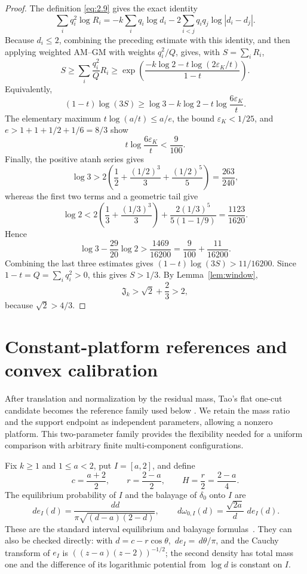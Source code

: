 \documentclass[11pt]{article}
\numberwithin{equation}{section}
\theoremstyle{plain}
\theoremstyle{definition}
\theoremstyle{remark}
\newcommand{\1}{\mathbf 1}
\newcommand{\dd}{\,d}
\newcommand{\eps}{\varepsilon}
\newcommand{\J}{\mathfrak J}
\begin{document}
\begin{proof}
The definition \eqref{eq:2.9} gives the exact identity
\[
 \sum_iq_i^2\log R_i
 =-k\sum_iq_i\log d_i
  -2\sum_{i<j}q_iq_j\log|d_i-d_j|.
\]
Because $d_i\le2$, combining the preceding estimate with this identity, and then applying weighted AM--GM with
weights $q_i^2/Q$, gives, with $S=\sum_iR_i$,
\[
 S\ge\sum_i\frac{q_i^2}{Q}R_i
 \ge\exp\left(\frac{-k\log2-t\log(2\eps_K/t)}{1-t}\right).
\]
Equivalently,
\[
 (1-t)\log(3S)
 \ge\log3-k\log2-t\log\frac{6\eps_K}{t}.
\]
The elementary maximum $t\log(a/t)\le a/e$, the bound $\eps_K<1/25$, and
$e>1+1+1/2+1/6=8/3$ show
\[
 t\log\frac{6\eps_K}{t}<\frac9{100}.
\]
Finally, the positive atanh series gives
\[
 \log3>2\left(\frac12+\frac{(1/2)^3}{3}+\frac{(1/2)^5}{5}\right)
 =\frac{263}{240},
\]
whereas the first two terms and a geometric tail give
\[
 \log2<2\left(\frac13+\frac{(1/3)^3}{3}\right)
 +\frac{2(1/3)^5}{5(1-1/9)}=\frac{1123}{1620}.
\]
Hence
\[
 \log3-\frac{29}{20}\log2
 >\frac{1469}{16200}=\frac9{100}+\frac{11}{16200}.
\]
Combining the last three estimates gives
$(1-t)\log(3S)>11/16200$.  Since $1-t=Q=\sum_iq_i^2>0$, this gives
$S>1/3$.  By
Lemma~\ref{lem:window},
\[
 \J_k>\sqrt2+\frac23>2,
\]
because $\sqrt2>4/3$.
\end{proof}

\section{Constant-platform references and convex calibration}

After translation and normalization by the residual mass, Tao's flat
one-cut candidate becomes the reference family used below
\cite[Section~4]{Tao1038Updated}.  We retain the mass ratio and the support
endpoint as independent parameters, allowing a nonzero platform.  This
two-parameter family provides the flexibility needed for a uniform
comparison with arbitrary finite multi-component configurations.

Fix $k\ge1$ and $1\le a<2$, put $I=[a,2]$, and define
\[
 c=\frac{a+2}{2},\qquad r=\frac{2-a}{2},\qquad H=\frac r2=\frac{2-a}{4}.
\]
The equilibrium probability of $I$ and the balayage of $\delta_0$ onto
$I$ are
\begin{equation}
 \dd e_I(d)=\frac{\dd d}{\pi\sqrt{(d-a)(2-d)}},\qquad
 \dd\omega_{0,I}(d)=\frac{\sqrt{2a}}d\,\dd e_I(d).
\label{eq:4.2}
\end{equation}
These are the standard interval equilibrium and balayage
formulas~\cite[Chapters I--II]{SaffTotik1997}.  They can also be checked directly:
with $d=c-r\cos\theta$, $\dd e_I=\dd\theta/\pi$, and the Cauchy transform
of $e_I$ is $((z-a)(z-2))^{-1/2}$; the second density has total mass one
and the difference of its logarithmic potential from $\log d$ is constant
on $I$.
\end{document}
